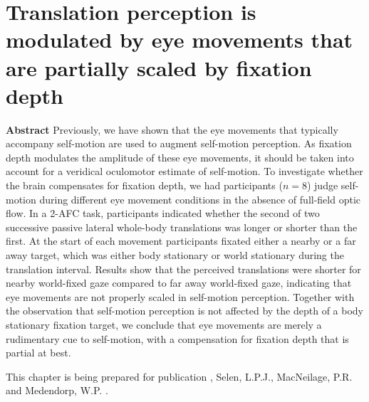 
\thispagestyle{empty}


\chapter{Translation perception is modulated by eye movements that are partially scaled by fixation depth}
\chaptermark{}

\newpage

\small {\bf Abstract}
Previously, we have shown that the eye movements that typically accompany self-motion are used to augment self-motion perception. As fixation depth modulates the amplitude of these eye movements, it should be taken into account for a veridical oculomotor estimate of self-motion. To investigate whether the brain compensates for fixation depth, we had  participants ($n = 8$) judge self-motion during different eye movement conditions in the absence of full-field optic flow.  In a 2-AFC task, participants indicated whether the second of two successive passive lateral whole-body translations was longer or shorter than the first. At the start of each movement participants fixated either a nearby or a far away target, which was either body stationary or world stationary during the translation interval. Results show that the perceived translations were shorter for nearby world-fixed gaze compared to far away world-fixed gaze, indicating that eye movements are not properly scaled in self-motion perception. Together with the observation that self-motion perception is not affected by the depth of a body stationary fixation target, we conclude that eye movements are merely a rudimentary cue to self-motion, with a compensation for fixation depth that is partial at best.

\vfill

\noindent\underline{ \hspace{4cm} }

\noindent This chapter is being prepared for publication \newline
{}, Selen, L.P.J., MacNeilage, P.R. and Medendorp, W.P. \citeyear{clemens2015b}. %

\newpage






